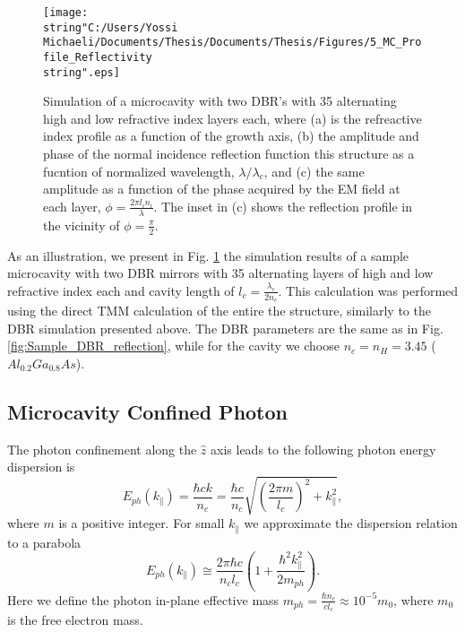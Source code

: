 %
\begin{figure}
\begin{centering}
\texttt{[image: \\string"C:/Users/Yossi Michaeli/Documents/Thesis/Documents/Thesis/Figures/5\_MC\_Profile\_Reflectivity\\string".eps]}
\par\end{centering}

\caption{\label{fig:Sample_MC_reflection}Simulation of a microcavity with
two DBR's with 35 alternating high and low refractive index layers
each, where (a) is the refreactive index profile as a function of
the growth axis, (b) the amplitude and phase of the normal incidence
reflection function this structure as a fucntion of normalized wavelength,
$\lambda/\lambda_{c}$, and (c) the same amplitude as a function of
the phase acquired by the EM field at each layer, $\phi=\frac{2\pi l_{i}n_{i}}{\lambda}$.
The inset in (c) shows the reflection profile in the vicinity of $\phi=\frac{\pi}{2}$.}



\end{figure}


As an illustration, we present in Fig. \ref{fig:Sample_MC_reflection}
the simulation results of a sample microcavity with two DBR mirrors
with 35 alternating layers of high and low refractive index each and
cavity length of $l_{c}=\frac{\lambda_{c}}{2n_{c}}$. This calculation
was performed using the direct TMM calculation of the entire the structure,
similarly to the DBR simulation presented above. The DBR parameters
are the same as in Fig. \ref{fig:Sample_DBR_reflection}, while for
the cavity we choose $n_{c}=n_{H}=3.45$ ($Al_{0.2}Ga_{0.8}As$).

%
\begin{lyxgreyedout}

\subsection{Microcavity Confined Photon}

The photon confinement along the $\hat{z}$ axis leads to the following
photon energy dispersion is \citet{Skolnick1998} \begin{equation}
E_{ph}(k_{\parallel})=\frac{\hbar ck}{n_{c}}=\frac{\hbar c}{n_{c}}\sqrt{\left(\frac{2\pi m}{l_{c}}\right)^{2}+k_{\parallel}^{2}},\end{equation}
where $m$ is a positive integer. For small $k_{\parallel}$ we approximate
the dispersion relation to a parabola \begin{equation}
E_{ph}(k_{\parallel})\cong\frac{2\pi\hbar c}{n_{c}l_{c}}\left(1+\frac{\hbar^{2}k_{\parallel}^{2}}{2m_{ph}}\right).\end{equation}
Here we define the photon in-plane effective mass $m_{ph}=\frac{\hbar n_{c}}{cl_{c}}\approx10^{-5}m_{0}$,
where $m_{0}$ is the free electron mass.
\end{lyxgreyedout}

